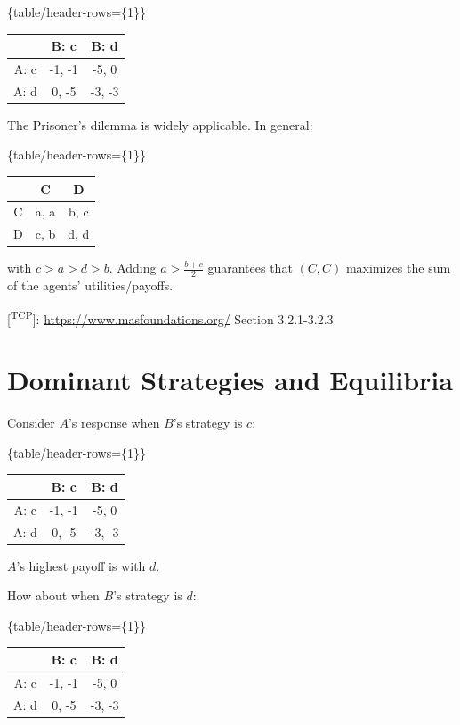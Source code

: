 \documentclass[11pt]{article}
\begin{document}
\tagpdfsetup\{table/header-rows=\{1\}\}
\begin{tabular}{|c|c|c|}\hline
       & B: c         & B: d         \\\hline
A: c & -1, -1 & -5, 0 \\\hline
A: d & 0, -5  & -3, -3 \\\hline
\end{tabular}


The Prisoner's dilemma is widely applicable.  In general:


\tagpdfsetup\{table/header-rows=\{1\}\}
\begin{tabular}{|c|c|c|}\hline
       & C         & D        \\\hline
C & a, a & b, c \\\hline
D & c, b & d, d  \\\hline
\end{tabular}


with \(c > a > d > b\).  Adding \(a > \frac{b+c}{2}\) guarantees that \((C, C)\) maximizes the sum of the agents' utilities/payoffs.

{[}\textsuperscript{TCP}]: \url{https://www.masfoundations.org/} Section 3.2.1-3.2.3
\section{Dominant Strategies and Equilibria}
\label{sec:org35ae761}




Consider \(A\)'s response when \(B\)'s strategy is \(c\):


\tagpdfsetup\{table/header-rows=\{1\}\}
\begin{tabular}{|c|c|c|}\hline
       & B: c         & B: d                 \\\hline
A: c & \cellcolor{lightgray} -1, -1 &  -5, 0 \\\hline
A: d & \cellcolor{lightgray} 0, -5   & -3, -3 \\\hline
\end{tabular}


\(A\)'s highest payoff is with \(d\).

How about when \(B\)'s strategy is \(d\):


\tagpdfsetup\{table/header-rows=\{1\}\}
\begin{tabular}{|c|c|c|}\hline
       & B: c         & B: d                 \\\hline
A: c & -1, -1  & \cellcolor{lightgray} -5, 0  \\\hline
A: d & 0, -5   & \cellcolor{lightgray} -3, -3 \\\hline
\end{tabular}
\end{document}
